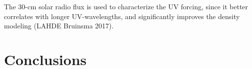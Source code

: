 \documentclass[referee,a4paper,12pt,traditabstract]{swsc}
\begin{document}
\begin{linenumbers}
The 30-cm solar radio flux is used to characterize the UV forcing, since it better correlates with longer UV-wavelengths, and significantly improves the density modeling (LAHDE Bruinsma 2017). 

\section{Conclusions}



\begin{acknowledgements}

\end{acknowledgements}




\end{linenumbers}
\end{document}
